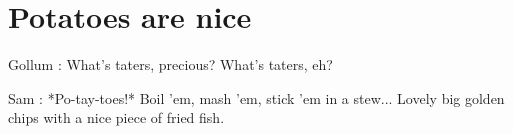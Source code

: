 \documentclass[../../../main.tex]{subfiles}
\begin{document}

\onlyonchapterfile{
}




\chapter{Potatoes are nice}


Gollum : What's taters, precious? What's taters, eh?

Sam : *Po-tay-toes!* Boil 'em, mash 'em, stick 'em in a stew... Lovely big golden chips with a nice piece of fried fish.

\lipsum[3-12]



\end{document}
